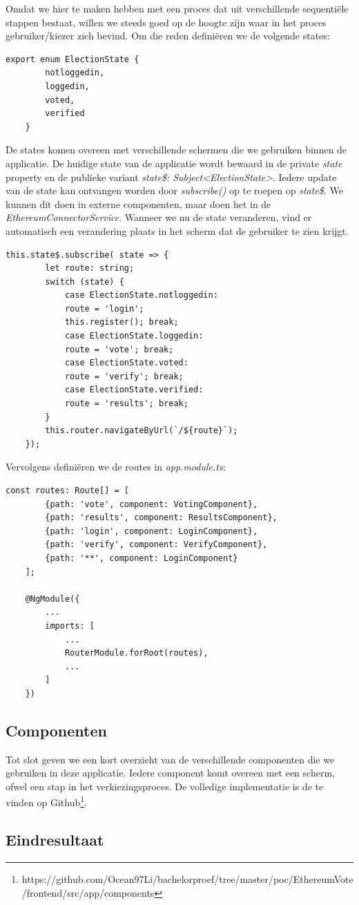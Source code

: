 	Omdat we hier te maken hebben met een proces dat uit verschillende sequentiële stappen bestaat, willen we steeds goed op de hoogte zijn waar in het proces gebruiker/kiezer zich bevind. Om die reden definiëren we de volgende states:
	\begin{lstlisting}[numbers=none]
	export enum ElectionState {
		notloggedin,
		loggedin,				
		voted, 						
		verified  					 
	}
	\end{lstlisting}
	De states komen overeen met verschillende schermen die we gebruiken binnen de applicatie. De huidige state van de applicatie wordt bewaard in de private \textit{state} property en de publieke variant \textit{state\$: Subject<ElectionState>}. Iedere update van de state kan ontvangen worden door \textit{subscribe()} op te roepen op \textit{state\$}. We kunnen dit doen in externe componenten, maar doen het in de \textit{EthereumConnectorService}. Wanneer we  nu de state veranderen, vind er automatisch een verandering plaats in het scherm dat de gebruiker te zien krijgt.
	\begin{lstlisting}[numbers=none]
	this.state$.subscribe( state => {
		let route: string;
		switch (state) {
			case ElectionState.notloggedin:
			route = 'login';
			this.register(); break;
			case ElectionState.loggedin:
			route = 'vote'; break;
			case ElectionState.voted:
			route = 'verify'; break;
			case ElectionState.verified:
			route = 'results'; break;
		}
		this.router.navigateByUrl(`/${route}`);
	});
	\end{lstlisting}
	Vervolgens definiëren we de routes in \textit{app.module.ts}:
	\begin{lstlisting}[numbers=none]
	const routes: Route[] = [
		{path: 'vote', component: VotingComponent},
		{path: 'results', component: ResultsComponent},
		{path: 'login', component: LoginComponent},
		{path: 'verify', component: VerifyComponent},
		{path: '**', component: LoginComponent}
	];
	
	@NgModule({
		...
		imports: [
			...
			RouterModule.forRoot(routes),
			...
		]
	})
	\end{lstlisting}
	\subsection{Componenten}
	Tot slot geven we een kort overzicht van de verschillende componenten die we gebruiken in deze applicatie. Iedere component komt overeen met een scherm, ofwel een stap in het verkiezingsproces. De volledige implementatie is de te vinden op Github\footnote{https://github.com/Ocean97Li/bachelorproef/tree/master/poc/EthereumVote/frontend/src/app/components}.
	
	
	\subsection{Eindresultaat}

	
	
	
	
	
	
	
	
	
	
	
	
	
	
	
	
	
	
	
	
	
	
	
	

	








